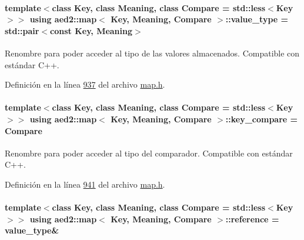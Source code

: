 \paragraph[{\texorpdfstring{value\+\_\+type}{value_type}}]{\setlength{\rightskip}{0pt plus 5cm}template$<$class Key, class Meaning, class Compare = std\+::less$<$\+Key$>$$>$ using {\bf aed2\+::map}$<$ Key, Meaning, Compare $>$\+::{\bf value\+\_\+type} =  std\+::pair$<$const Key, Meaning$>$}\hypertarget{classaed2_1_1map_a719db98e0ff9a837610f76be33264680_a719db98e0ff9a837610f76be33264680}{}\label{classaed2_1_1map_a719db98e0ff9a837610f76be33264680_a719db98e0ff9a837610f76be33264680}


Renombre para poder acceder al tipo de las valores almacenados. Compatible con estándar C++. 



Definición en la línea \hyperlink{map_8h_source_l00937}{937} del archivo \hyperlink{map_8h_source}{map.\+h}.

\paragraph[{\texorpdfstring{key\+\_\+compare}{key_compare}}]{\setlength{\rightskip}{0pt plus 5cm}template$<$class Key, class Meaning, class Compare = std\+::less$<$\+Key$>$$>$ using {\bf aed2\+::map}$<$ Key, Meaning, Compare $>$\+::{\bf key\+\_\+compare} =  Compare}\hypertarget{classaed2_1_1map_a3efa081d3379ab76f33a5ef9fe697523_a3efa081d3379ab76f33a5ef9fe697523}{}\label{classaed2_1_1map_a3efa081d3379ab76f33a5ef9fe697523_a3efa081d3379ab76f33a5ef9fe697523}


Renombre para poder acceder al tipo del comparador. Compatible con estándar C++. 



Definición en la línea \hyperlink{map_8h_source_l00941}{941} del archivo \hyperlink{map_8h_source}{map.\+h}.

\paragraph[{\texorpdfstring{reference}{reference}}]{\setlength{\rightskip}{0pt plus 5cm}template$<$class Key, class Meaning, class Compare = std\+::less$<$\+Key$>$$>$ using {\bf aed2\+::map}$<$ Key, Meaning, Compare $>$\+::{\bf reference} =  {\bf value\+\_\+type}\&}\hypertarget{classaed2_1_1map_af4f147533b3c0207ab036c86ce13ec0d_af4f147533b3c0207ab036c86ce13ec0d}{}\label{classaed2_1_1map_af4f147533b3c0207ab036c86ce13ec0d_af4f147533b3c0207ab036c86ce13ec0d}


